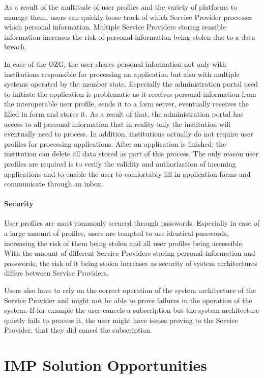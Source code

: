 As a result of the multitude of user profiles and the variety of platforms to manage them, users can quickly loose track of which Service Provider processes which personal information. Multiple Service Providers storing sensible information increases the risk of personal information being stolen due to a data breach.


In case of the OZG, the user shares personal information not only with institutions responsible for processing an application but also with multiple systems operated by the member state. Especially the administration portal used to initiate the application is problematic as it receives personal information from the interoperable user profile, sends it to a form server, eventually receives the filled in form and stores it. As a result of that, the administration portal has access to all personal information that in reality only the institution will eventually need to process. In addition, institutions actually do not require user profiles for processing applications. After an application is finished, the institution can delete all data stored as part of this process. The only reason user profiles are required is to verify the validity and authorization of incoming applications and to enable the user to comfortably fill in application forms and communicate through an inbox. 

\paragraph{Security}

User profiles are most commonly secured through passwords. Especially in case of a large amount of profiles, users are tempted to use identical passwords, increasing the risk of them being stolen and all user profiles being accessible. With the amount of different Service Providers storing personal information and passwords, the risk of it being stolen increases as security of system architectures differs between Service Providers.

Users also have to rely on the correct operation of the system architecture of the Service Provider and might not be able to prove failures in the operation of the system. If for example the user cancels a subscription but the system architecture quietly fails to process it, the user might have issues proving to the Service Provider, that they did cancel the subscription.


\section{IMP Solution Opportunities} \label{section:imp_solution_opportunities}

